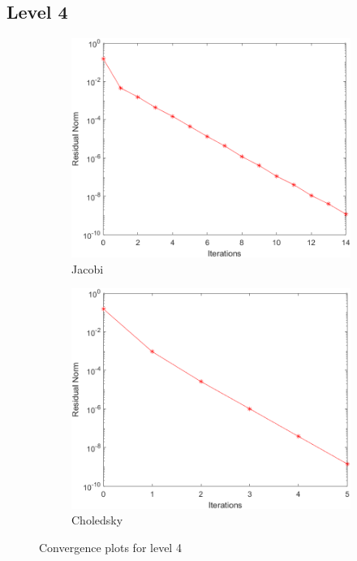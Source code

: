 \documentclass[a4paper, 11pt]{article}
\begin{document}
			\subsection*{Level 4}
				\begin{figure}[H]
					\begin{subfigure}{.49\textwidth}
						\centering
						\includegraphics[width=.99\linewidth]{img4/J.png}  
						\caption{Jacobi}
						\label{fig:Jacobi_4}
					\end{subfigure}
					\begin{subfigure}{.49\textwidth}
						\centering
						\includegraphics[width=.99\linewidth]{img4/C.png}  
						\caption{Choledsky}
						\label{fig:Chol_4}
					\end{subfigure}
					\caption{Convergence plots for level 4}
					\label{fig:fig4}
				\end{figure}
			
\end{document}
